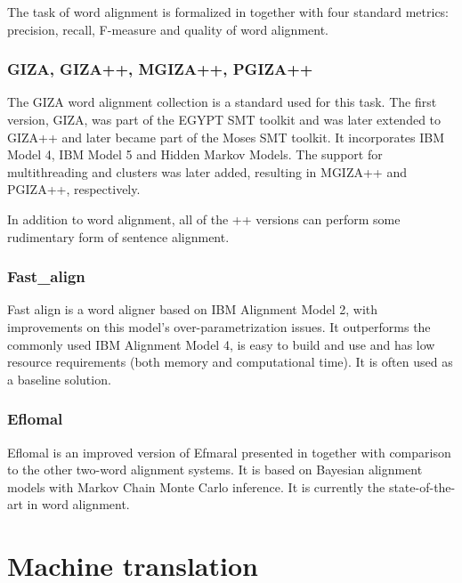 The task of word alignment is formalized in \cite{mihalcea_evaluation:2003} together with four standard metrics: precision, recall, F-measure and quality of word alignment.

\pagebreak
\subsubsection{GIZA, GIZA++, MGIZA++, PGIZA++}
The GIZA word alignment collection is a standard used for this task. The first version, GIZA, was part of the EGYPT SMT toolkit and was later extended to GIZA++ and later became part of the Moses SMT toolkit.  It incorporates IBM Model 4, IBM Model 5 and Hidden Markov Models. The support for multithreading and clusters was later added, resulting in MGIZA++ and PGIZA++, respectively.


In addition to word alignment, all of the ++ versions can perform some rudimentary form of sentence alignment.

\subsubsection{Fast\_align}
Fast align \citep{fastalign:2013} is a word aligner based on IBM Alignment Model 2, with improvements on this model's over-parametrization issues. It outperforms the commonly used IBM Alignment Model 4, is easy to build and use and has low resource requirements (both memory and computational time). It is often used as a baseline solution.

\subsubsection{Eflomal}
Eflomal is an improved version of Efmaral presented in \cite{ostling_efmaral:2016} together with comparison to the other two-word alignment systems. It is based on Bayesian alignment models with Markov Chain Monte Carlo inference. It is currently the state-of-the-art in word alignment.

\section{Machine translation}

